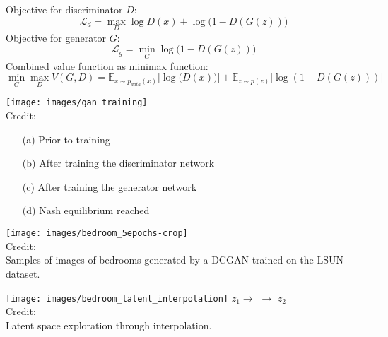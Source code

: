 \documentclass[11pt, a4paper, landscape]{article}
\begin{document}
\NewPage{}
\vfill
	Objective for discriminator $D$:
	\begin{equation}
    \mathcal{L}_d = \max_{D} \log D(x) + \log \big(1 - D(G(z))\big)
	\end{equation}
	Objective for generator $G$:\\
	\begin{equation}
    \mathcal{L}_g = \min_{G} \log\big(1 - D(G(z))\big)
	\end{equation}
	\vfill
	Combined value function as minimax function:\\
	\begin{equation}
		\min_{G} \max_{D} V(G,D) = \mathbb{E}_{x \sim p_{data}(x)}\big[\log \big(D(x)\big)\big] + \mathbb{E}_{z \sim p(z)}\big[\log (1 - D(G(z)))\big]
	\end{equation}
\vfill

\NewPage{}
\vfill
	\begin{center}
		\texttt{[image: images/gan\_training]}\\

		Credit:
		\vfill
		\begin{itemize}
			\item[(a)] Prior to training
			\item[(b)] After training the discriminator network
			\item[(c)] After training the generator network
			\item[(d)] Nash equilibrium reached
		\end{itemize}
	\end{center}
\vfill


\NewPage{}
	\begin{center}
		\texttt{[image: images/bedroom\_5epochs-crop]}\\
		\vfill
		Credit: \cite{dcgan:2015}\\ Samples of images of bedrooms generated by a DCGAN trained on the
		LSUN dataset.
		\vfill
	\end{center}

\NewPage{}
	\begin{center}
    \vfill
    \centering
		\texttt{[image: images/bedroom\_latent\_interpolation]}
    \vfill
    $z_1$\hfill $\longrightarrow$ \hfill $\longrightarrow$ \hfill $z_2$\\
		\vfill
    \centering
		Credit: \cite{dcgan:2015}\\
		Latent space exploration through interpolation.
		\vfill
	\end{center}
\end{document}
